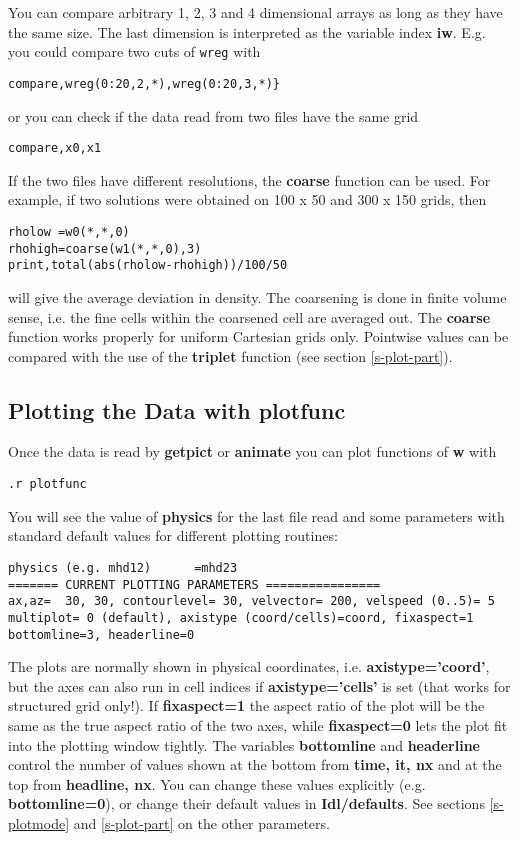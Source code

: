   You can compare arbitrary 1, 2, 3 and 4 dimensional arrays as long as they 
   have the same size.
   The last dimension is interpreted as the variable index {\bf iw}.
   E.g. you could compare two cuts of {\tt wreg} with
\begin{verbatim}
compare,wreg(0:20,2,*),wreg(0:20,3,*)}
\end{verbatim}
   or you can check if the data read from two files have the same grid
\begin{verbatim}
compare,x0,x1
\end{verbatim}
   If the two files have different resolutions, the {\bf coarse} 
   function can be used. For example, if two solutions were obtained on 
   100 x 50 and 300 x 150 grids, then 
\begin{verbatim}
rholow =w0(*,*,0)
rhohigh=coarse(w1(*,*,0),3)
print,total(abs(rholow-rhohigh))/100/50
\end{verbatim}
   will give the average deviation in density. The coarsening is done in
   finite volume sense, i.e. the fine cells within the coarsened cell are
   averaged out. The {\bf coarse} function works properly for
   uniform Cartesian grids only. Pointwise values can be compared
   with the use of the {\bf triplet} function (see section \ref{s-plot-part}).


\subsection{Plotting the Data with plotfunc \label{s-plotfunc}}

   Once the data is read by {\bf getpict} or {\bf animate} you can plot 
   functions of {\bf w} with
\begin{verbatim}
.r plotfunc
\end{verbatim}
   You will see the value of {\bf physics} for the last file read and some 
   parameters with standard default values for different plotting routines:
\begin{verbatim}
physics (e.g. mhd12)      =mhd23
======= CURRENT PLOTTING PARAMETERS ================
ax,az=  30, 30, contourlevel= 30, velvector= 200, velspeed (0..5)= 5
multiplot= 0 (default), axistype (coord/cells)=coord, fixaspect=1
bottomline=3, headerline=0
\end{verbatim}
   The plots are normally shown in physical coordinates, i.e.
   {\bf axistype='coord'}, but the axes can also run in cell indices 
   if {\bf axistype='cells'} is set (that works for structured grid only!).
   If {\bf fixaspect=1} the aspect ratio of the plot will be the same
   as the true aspect ratio of the two axes, while {\bf fixaspect=0} lets
   the plot fit into the plotting window tightly.
   The variables {\bf bottomline} and {\bf headerline} control the number
   of values shown at the bottom from {\bf time, it, nx} and at the top 
   from {\bf headline, nx}.
   You can change these values explicitly (e.g. {\bf bottomline=0}), or change 
   their default values in {\bf Idl/defaults}. 
   See sections \ref{s-plotmode} and \ref{s-plot-part} on the other parameters.

